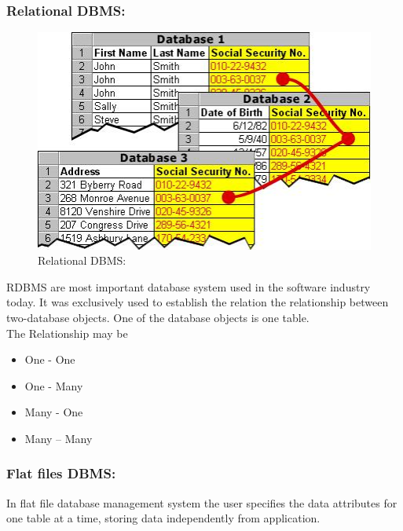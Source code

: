 \documentclass[14pt]{article} %
\begin{document}
\subsubsection{\textbf{Relational DBMS:}}
 \begin{figure}[H]
    \centerline{\includegraphics[width=0.65\linewidth]{relational.jpg}}
  \caption{Relational DBMS:}
  \label{fig:figure 11}
\end{figure}
RDBMS are most important database system used in the software industry today. It was exclusively used to establish the relation the relationship between two-database objects. One of the database objects is one table.
\\The Relationship may be
\begin{itemize}
\item One - One 
\item One - Many
\item Many - One
\item Many – Many
\end{itemize}
\subsubsection{\textbf{Flat files DBMS:}}
 In flat file database management system the user specifies the data attributes for one table at a time, storing data independently from application.
\end{document}
